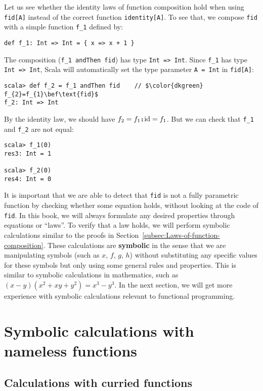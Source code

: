 Let us see whether the identity laws of function composition hold
when using \lstinline!fid[A]! instead of the correct function \lstinline!identity[A]!.
To see that, we compose \lstinline!fid! with a simple function \lstinline!f_1!
defined by:
\begin{lstlisting}
def f_1: Int => Int = { x => x + 1 }
\end{lstlisting}
The composition (\lstinline!f_1 andThen fid!) has type \lstinline!Int => Int!.
Since \lstinline!f_1! has type \lstinline!Int => Int!, Scala will
automatically set the type parameter \lstinline!A = Int! in \lstinline!fid[A]!:
\begin{lstlisting}[mathescape=true]
scala> def f_2 = f_1 andThen fid    // $\color{dkgreen} f_{2}=f_{1}\bef\text{fid}$
f_2: Int => Int
\end{lstlisting}
By the identity law, we should have $f_{2}=f_{1}\bef\text{id}=f_{1}$.
But we can check that \lstinline!f_1! and \lstinline!f_2! are not
equal:
\begin{lstlisting}
scala> f_1(0)
res3: Int = 1

scala> f_2(0)
res4: Int = 0
\end{lstlisting}

It is important that we are able to detect that \lstinline!fid! is
not a fully parametric function by checking whether some equation
holds, without looking at the code of \lstinline!fid!. In this book,
we will always formulate any desired properties through equations
or \textsf{``}laws\textsf{''}. To verify that a law holds, we will perform symbolic
calculations similar to the proofs in
Section~\ref{subsec:Laws-of-function-composition}. These calculations
are \textbf{symbolic} in the sense that we are manipulating symbols
(such as $x$, $f$, $g$, $h$) without substituting any specific
values for these symbols but only using some general rules and properties.
This is similar to symbolic calculations in mathematics, such as $\left(x-y\right)\left(x^{2}+xy+y^{2}\right)=x^{3}-y^{3}$.
In the next section, we will get more experience with symbolic calculations
relevant to functional programming.

\section{Symbolic calculations with nameless functions}

\subsection{Calculations with curried functions}

